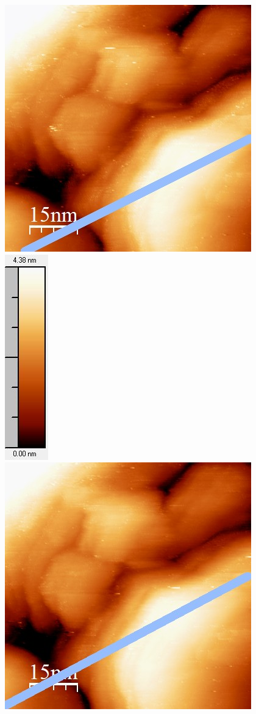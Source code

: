 \documentclass[12pt,a4paper]{article}
\begin{document}
\begin{figure}
\centering
\includegraphics[scale=0.6]{Bilder/Anhang/Zeit/0_08_Zeit_vor.jpg}
\includegraphics[scale=0.6]{Bilder/Anhang/Zeit/0_08_Zeit_vor_Skala.jpg}
\includegraphics[scale=0.6]{Bilder/Anhang/Zeit/0_08_Zeit_nach.jpg}

\end{figure}
\end{document}
